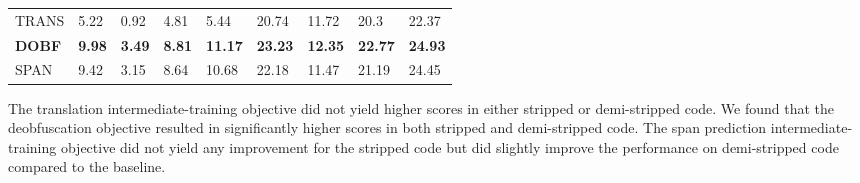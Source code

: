 \begin{table}[!h]
\begin{tabular}{l|llll|llll}
TRANS                                                  & 5.22                                & 0.92     & 4.81  &  5.44                                                       & 20.74                              & 11.72                               & 20.3  &  22.37                               \\
\textbf{DOBF}                                          & \textbf{9.98}                       & \textbf{3.49}                    & \textbf{8.81}                       & \textbf{11.17}                       & \textbf{23.23}                     & \textbf{12.35}                   & \textbf{22.77}                       & \textbf{24.93}                        \\
SPAN                                                   & 9.42                                & 3.15                             & 8.64  &  10.68                                & 22.18                              & 11.47                            & 21.19                                &   24.45                              
\end{tabular}
\end{table}
The translation intermediate-training objective did not yield higher scores in either stripped or demi-stripped code. We found that the deobfuscation objective resulted in significantly higher scores in both stripped and demi-stripped code. The span prediction intermediate-training objective did not yield any improvement for the stripped code but did slightly improve the performance on demi-stripped code compared to the baseline.

